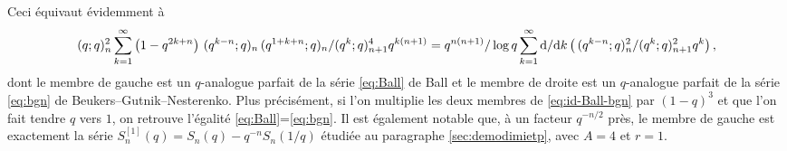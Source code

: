 \documentclass[12pt]{amsart}
\newcommand{\dd}{\textup{d}}
\theoremstyle{remark}
\numberwithin{equation}{section}
\begin{document}
Ceci {\'e}quivaut {\'e}videmment {\`a}
\begin{equation} \label{eq:id-Ball-bgn}
({\let \over / \def\frac#1#2{#1 / #2} q}; q) _{n}^2 
       \sum _{k=1} ^ {\infty} \frac{\left( 1 - q^ {2 k + n} \right)
       \,({\let \over / \def\frac#1#2{#1 / #2} q^ {k - n}}; q)
       _{n} \,({\let \over / \def\frac#1#2{#1 / #2} q^ {1 +
       k + n}}; q) _{n} }{({\let \over / \def\frac#1#2{#1 / #2}
       q^ k}; q) _{n+1} ^ 4}q^
       {k \left( n+1 \right) } 
= \frac{q^{n(n+1)}   }{\log q}
         \sum _{k=1} ^ {\infty} \frac {\dd} {\dd k}\left(\frac{ 
          \,({\let \over / \def\frac#1#2{#1 / #2}
           q^ {k - n}}; q) _{n} ^2}{({\let \over /
          \def\frac#1#2{#1 / #2}  q^ k}; q)
          _{n+1} ^ 2} q^ k  \right),
\end{equation}
dont le membre de gauche est un $q$-analogue parfait de la s{\'e}rie
\eqref{eq:Ball} de Ball et le membre de droite est un $q$-analogue parfait de la s{\'e}rie 
\eqref{eq:bgn} de Beukers--Gutnik--Nesterenko.
Plus pr{\'e}cis{\'e}ment, 
si l'on multiplie les deux membres de \eqref{eq:id-Ball-bgn} par
$(1-q)^3$ et que l'on fait tendre $q$ vers $1$, on retrouve l'{\'e}galit{\'e}
\eqref{eq:Ball}=\eqref{eq:bgn}. Il est {\'e}galement notable 
que, {\`a} un facteur $q^{-n/2}$ pr{\`e}s,   
le membre de gauche est exactement la s{\'e}rie 
$
S^{[1]}_n(q)=
S_n(q)-q^{-n}S_n(1/q)$ {\'e}tudi{\'e}e au 
paragraphe \ref{sec:demodimietp}, avec $A=4$ et $r=1$. 
\end{document}
